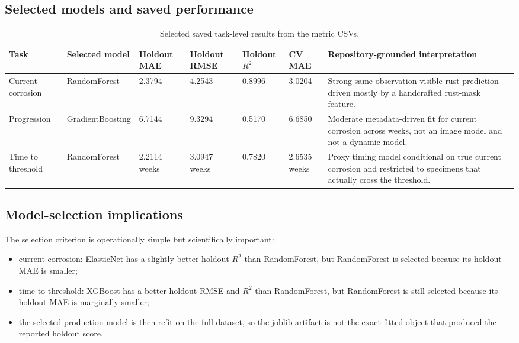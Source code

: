 \documentclass[11pt]{article}
\begin{document}
\subsection{Selected models and saved performance}

\begin{table}[H]
\centering
\small
\begin{tabularx}{\textwidth}{p{} p{} p{} p{} p{} p{} Y}
\toprule
\textbf{Task} & \textbf{Selected model} & \textbf{Holdout MAE} & \textbf{Holdout RMSE} & \textbf{Holdout \(R^2\)} & \textbf{CV MAE} & \textbf{Repository-grounded interpretation} \\
\midrule
Current corrosion & RandomForest & 2.3794 & 4.2543 & 0.8996 & 3.0204 & Strong same-observation visible-rust prediction driven mostly by a handcrafted rust-mask feature. \\
Progression & GradientBoosting & 6.7144 & 9.3294 & 0.5170 & 6.6850 & Moderate metadata-driven fit for current corrosion across weeks, not an image model and not a dynamic model. \\
Time to threshold & RandomForest & 2.2114 weeks & 3.0947 weeks & 0.7820 & 2.6535 weeks & Proxy timing model conditional on true current corrosion and restricted to specimens that actually cross the threshold. \\
\bottomrule
\end{tabularx}
\caption{Selected saved task-level results from the metric CSVs.}
\label{tab:selected_results}
\end{table}

\subsection{Model-selection implications}
The selection criterion is operationally simple but scientifically important:
\begin{itemize}
  \item current corrosion: ElasticNet has a slightly better holdout \(R^2\) than RandomForest, but RandomForest is selected because its holdout MAE is smaller;
  \item time to threshold: XGBoost has a better holdout RMSE and \(R^2\) than RandomForest, but RandomForest is still selected because its holdout MAE is marginally smaller;
  \item the selected production model is then refit on the full dataset, so the joblib artifact is not the exact fitted object that produced the reported holdout score.
\end{itemize}
\end{document}
